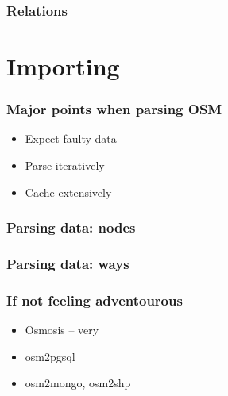 \documentclass[14pt]{beamer}
\begin{document}
\begin{frame}
  \frametitle{Relations}
\end{frame}


\section{Importing}
\label{sec:importing}

\begin{frame}
  \frametitle{Major points when parsing OSM}
  \begin{itemize}
  \item Expect faulty data
  \item Parse iteratively
  \item Cache extensively
  \end{itemize}
\end{frame}

\begin{frame}
  \frametitle{Parsing data: nodes}
\end{frame}

\begin{frame}
  \frametitle{Parsing data: ways}
\end{frame}

\begin{frame}
  \frametitle{If not feeling adventourous}
  \begin{itemize}
  \item Osmosis -- very
  \item osm2pgsql
  \item osm2mongo, osm2shp
  \end{itemize}
\end{frame}
\end{document}
